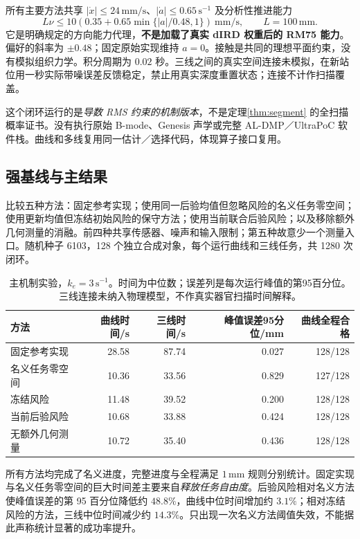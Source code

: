 \documentclass[UTF8,11pt,a4paper,fontset=fandol]{ctexart}
\numberwithin{equation}{section}
\theoremstyle{definition}
\begin{document}
所有主要方法共享 $|\dot x|\le24\,\mathrm{mm/s}$、$|\dot a|\le0.65\,\mathrm{s^{-1}}$ 及分析性推进能力
\begin{equation}
 L\nu\le10\left(0.35+0.65\min\{|a|/0.48,1\}\right)\ \mathrm{mm/s},
 \qquad L=100\,\mathrm{mm}.
 \label{eq:simcap}
\end{equation}
它是明确规定的方向能力代理，\textbf{不是加载了真实 dIRD 权重后的 RM75 能力}。偏好的斜率为 $\pm0.48$；固定原始实现维持 $a=0$。接触是共同的理想平面约束，没有模拟组织力学。积分周期为 $0.02$ 秒。三线之间的真实空间连接未模拟，在新站位用一秒实际带噪误差反馈稳定，禁止用真实深度重置状态；连接不计作扫描覆盖。

这个闭环运行的是\emph{导数 RMS 约束的机制版本}，不是定理\ref{thm:segment} 的全扫描概率证书。没有执行原始 B-mode、Genesis 声学或完整 AL-DMP／UltraPoC 软件栈。曲线和多线复用同一估计／选择代码，体现算子接口复用。

\subsection{强基线与主结果}
比较五种方法：固定参考实现；使用同一后验均值但忽略风险的名义任务零空间；使用更新均值但冻结初始风险的保守方法；使用当前联合后验风险；以及移除额外几何测量的消融。前四种共享传感器、噪声和输入限制；第五种故意少一个测量入口。随机种子 6103，128 个独立合成对象，每个运行曲线和三线任务，共 1280 次闭环。

\begin{table}[ht]\centering\small
\begin{tabularx}{\linewidth}{p{.23\linewidth}rrrr}
\toprule
方法 & 曲线时间/s & 三线时间/s & 峰值误差95分位/mm & 曲线全程合格\\\midrule
固定参考实现 & 28.58 & 87.74 & 0.027 & 128/128\\
名义任务零空间 & 10.36 & 33.56 & 0.829 & 127/128\\
冻结风险 & 11.48 & 39.52 & 0.200 & 128/128\\
当前后验风险 & 10.68 & 33.88 & 0.424 & 128/128\\
无额外几何测量 & 10.72 & 35.40 & 0.436 & 128/128\\
\bottomrule\end{tabularx}
\caption{主机制实验，$k_e=3\,\mathrm{s^{-1}}$。时间为中位数；误差列是每次运行峰值的第95百分位。三线连接未纳入物理模型，不作真实器官扫描时间解释。}
\end{table}

所有方法均完成了名义进度，完整进度与全程满足 $1\,\mathrm{mm}$ 规则分别统计。固定实现与名义任务零空间的巨大时间差主要来自\emph{释放任务自由度}。后验风险相对名义方法使峰值误差的第 95 百分位降低约 $48.8\%$，曲线中位时间增加约 $3.1\%$；相对冻结风险的方法，三线中位时间减少约 $14.3\%$。只出现一次名义方法阈值失效，不能据此声称统计显著的成功率提升。
\end{document}
